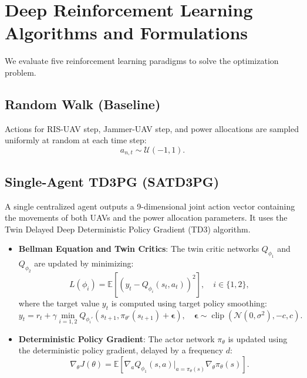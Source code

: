 \documentclass[journal,onecolumn]{IEEEtran}
\begin{document}
\section{Deep Reinforcement Learning Algorithms and Formulations}
We evaluate five reinforcement learning paradigms to solve the optimization problem.

\subsection{Random Walk (Baseline)}
Actions for RIS-UAV step, Jammer-UAV step, and power allocations are sampled uniformly at random at each time step:
\begin{equation}
    a_{n,t} \sim \mathcal{U}(-1, 1).
\end{equation}

\subsection{Single-Agent TD3PG (SATD3PG)}
A single centralized agent outputs a 9-dimensional joint action vector containing the movements of both UAVs and the power allocation parameters. It uses the Twin Delayed Deep Deterministic Policy Gradient (TD3) algorithm.
\begin{itemize}
    \item \textbf{Bellman Equation and Twin Critics}: The twin critic networks $Q_{\phi_1}$ and $Q_{\phi_2}$ are updated by minimizing:
    \begin{equation}
        L(\phi_i) = \mathbb{E}\left[ \left( y_t - Q_{\phi_i}(s_t, a_t) \right)^2 \right], \quad i \in \{1, 2\},
    \end{equation}
    where the target value $y_t$ is computed using target policy smoothing:
    \begin{equation}
        y_t = r_t + \gamma \min_{i=1,2} Q_{\phi_i'}\left( s_{t+1}, \pi_{\theta'}(s_{t+1}) + \bm{\epsilon} \right), \quad \bm{\epsilon} \sim \operatorname{clip}(\mathcal{N}(0, \sigma^2), -c, c).
    \end{equation}
    \item \textbf{Deterministic Policy Gradient}: The actor network $\pi_{\theta}$ is updated using the deterministic policy gradient, delayed by a frequency $d$:
    \begin{equation}
        \nabla_{\theta} J(\theta) = \mathbb{E}\left[ \nabla_a Q_{\phi_1}(s, a)|_{a=\pi_\theta(s)} \nabla_{\theta} \pi_{\theta}(s) \right].
    \end{equation}
\end{itemize}
\end{document}
